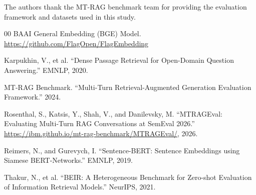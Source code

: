\documentclass[11pt]{article}
\begin{document}
The authors thank the MT-RAG benchmark team for providing the evaluation framework and datasets used in this study.

\begin{thebibliography}{00}
 BAAI General Embedding (BGE) Model. \url{https://github.com/FlagOpen/FlagEmbedding}

 Karpukhin, V., et al. ``Dense Passage Retrieval for Open-Domain Question Answering.'' EMNLP, 2020.

 MT-RAG Benchmark. ``Multi-Turn Retrieval-Augmented Generation Evaluation Framework.'' 2024.

 Rosenthal, S., Katsis, Y., Shah, V., and Danilevsky, M. ``MTRAGEval: Evaluating Multi-Turn RAG Conversations at SemEval 2026.'' \url{https://ibm.github.io/mt-rag-benchmark/MTRAGEval/}, 2026.

 Reimers, N., and Gurevych, I. ``Sentence-BERT: Sentence Embeddings using Siamese BERT-Networks.'' EMNLP, 2019.

 Thakur, N., et al. ``BEIR: A Heterogeneous Benchmark for Zero-shot Evaluation of Information Retrieval Models.'' NeurIPS, 2021.

\end{thebibliography}
\end{document}
